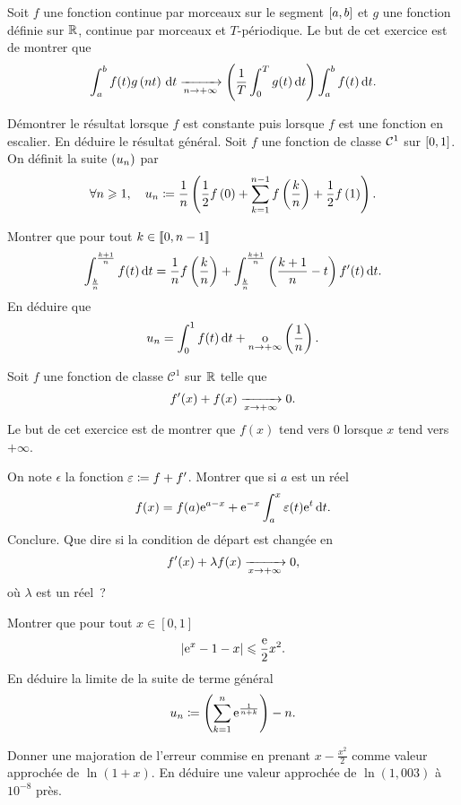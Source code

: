 \documentclass{magnolia}
\begin{document}
Soit $f$ une fonction continue par morceaux sur le segment $\left[a,b\right]$
et $g$ une fonction définie sur $\mathbb{R}$, continue par morceaux et $T$-périodique.
Le but de cet exercice est de montrer que
\[\int_{a}^{b} f(t)g\left(nt\right)\,\text{d}t \xrightarrow[n\rightarrow +\infty]{}
  \left(\frac{1}{T} \int_{0}^{T} g(t)\,\text{d}t\right) \int_{a}^{b} f(t)\,\text{d}t.\]
\begin{questions}
\question Démontrer le résultat lorsque $f$ est constante puis lorsque $f$
  est une fonction en escalier.
\question En déduire le résultat général.
\question Soit $f$ une fonction de classe $\mathcal{C}^{1}$ sur
  $\left[0,1\right]$. On définit la suite $\left(u_n\right)$ par
  \[\forall n\geqslant 1 ,\quad u_n\coloneqq \frac{1}{n}
    \left(\frac{1}{2}f\left(0\right)+\sum_{k=1}^{n-1} f\left(\frac{k}{n}\right)+\frac{1}{2}f\left(1\right)\right).\]
  \begin{questions}
  \question Montrer que pour tout $k\in\left\llbracket 0,n-1\right\rrbracket$
    \[\int_{\frac{k}{n}}^{\frac{k+1}{n}} f(t)\,\text{d}t=\frac{1}{n}f\left(\frac{k}{n}\right)
      +\int_{\frac{k}{n}}^{\frac{k+1}{n}} \left(\frac{k+1}{n}-t\right)f'(t)\,\text{d}t.\]
  \question En déduire que
    \[u_n=\int_{0}^{1} f(t)\,\text{d}t+\underset{n \rightarrow +\infty}{\text{o}}\left(\frac{1}{n}\right).\] 
  \end{questions}
\end{questions}

Soit $f$ une fonction de classe $\mathcal{C}^1$ sur $\mathbb{R}$ telle que
$$f'(x)+f(x) \xrightarrow[x\rightarrow +\infty]{} 0.$$
Le but de cet exercice est de montrer que $f(x)$ tend vers $0$ lorsque $x$
tend vers $+\infty$.
\begin{questions}
\question On note $\epsilon$ la fonction $\varepsilon\coloneqq f+f'$. Montrer que si $a$
  est un réel
  \[f(x)=f(a){\rm e}^{a-x}+{\rm e}^{-x}\int_{a}^{x} \varepsilon(t){\rm e}^t\,\text{d}t.\]
\question Conclure.
\question Que dire si la condition de départ est changée en
  \[f'(x)+\lambda f(x) \xrightarrow[x\rightarrow +\infty]{} 0,\]
  où $\lambda$ est un réel~?
\end{questions}


\begin{questions}
\question Montrer que pour tout $x\in[0,1]$
  \[\left|{\rm e}^x-1-x\right|\leqslant\frac{{\rm e}}{2}x^2.\]
\question En déduire la limite de la suite de terme général
  \[u_n\coloneqq \left(\sum_{k=1}^n {\rm e}^{\frac{1}{n+k}}\right) -n.\]
\end{questions}


Donner une majoration de l'erreur commise en prenant $x-\frac{x^2}{2}$
comme valeur approchée de $\ln(1+x)$. En déduire une valeur approchée de
$\ln(1,003)$ à $10^{-8}$ près.
\end{document}
